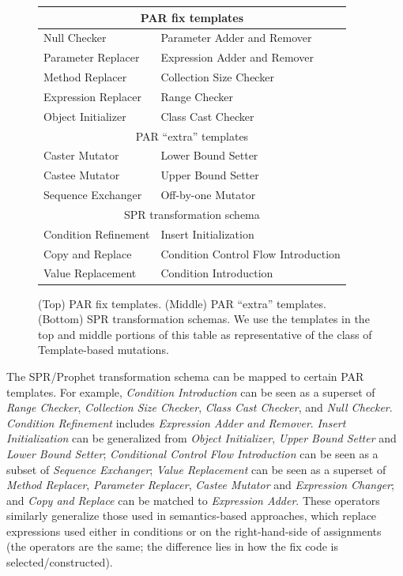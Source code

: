 \documentclass[conference]{IEEEtran}
\begin{document}
\begin{figure}[ht]
  \centering
{\small
\begin{tabular}{ll}
\toprule
\multicolumn{2}{c}{PAR fix templates} \\
\midrule
Null Checker & Parameter Adder and Remover \\ 
Parameter Replacer & Expression Adder and Remover \\  
Method Replacer & Collection Size Checker \\
Expression Replacer &  Range Checker\\
Object Initializer & Class Cast Checker\\
\midrule
\multicolumn{2}{c}{PAR ``extra'' templates} \\
\midrule
Caster Mutator & Lower Bound Setter  \\
Castee Mutator & Upper Bound Setter  \\
Sequence Exchanger & Off-by-one Mutator\\
\midrule
\multicolumn{2}{c}{SPR transformation schema} \\
\midrule
Condition Refinement & Insert Initialization \\
Copy and Replace & Condition Control Flow Introduction  \\
Value Replacement  & Condition Introduction \\
\bottomrule
\end{tabular}
  \caption{(Top) PAR fix templates. (Middle) PAR ``extra'' templates. (Bottom)
    SPR transformation schemas. We use the templates in the top and middle
    portions of this table as representative of the class of Template-based mutations. \label{approachTemplates}}
}

\end{figure}

The SPR/Prophet transformation schema can be mapped to certain PAR 
templates. For example, \emph{Condition Introduction} can be seen as a superset of 
\emph{Range Checker}, \emph{Collection Size 
Checker}, \emph{Class Cast Checker}, and \emph{Null Checker}. \emph{Condition Refinement} includes \emph{Expression Adder and Remover}. \emph{Insert Initialization} can be 
generalized from \emph{Object Initializer}, \emph{Upper Bound Setter} and \emph{Lower Bound Setter}; \emph{Conditional Control Flow Introduction} can be 
seen as a subset of \emph{Sequence Exchanger};
\emph{Value Replacement} can be seen as a superset of \emph{Method 
Replacer}, \emph{Parameter Replacer}, \emph{Castee Mutator} and \emph{Expression Changer}; and \emph{Copy 
and Replace} can be matched to \emph{Expression Adder}. 
These operators similarly generalize those used in semantics-based approaches,
which replace expressions used either in conditions or on the right-hand-side of
assignments (the operators are the same; the difference lies in how the fix code
is selected/constructed). 
\end{document}
